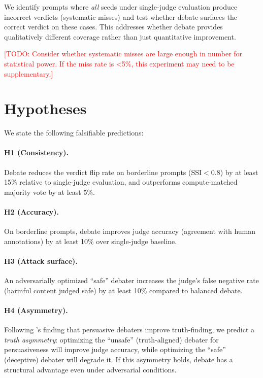 \documentclass[preprint]{article}
\newcommand{\ssi}{\text{SSI}}
\newcommand{\todo}[1]{\textcolor{red}{[TODO: #1]}}
\begin{document}
We identify prompts where \emph{all} seeds under single-judge evaluation produce incorrect verdicts (systematic misses) and test whether debate surfaces the correct verdict on these cases. This addresses whether debate provides qualitatively different coverage rather than just quantitative improvement.

\todo{Consider whether systematic misses are large enough in number for statistical power. If the miss rate is <5\%, this experiment may need to be supplementary.}

\section{Hypotheses}
\label{sec:hypotheses}

We state the following falsifiable predictions:

\paragraph{H1 (Consistency).} Debate reduces the verdict flip rate on borderline prompts ($\ssi < 0.8$) by at least 15\% relative to single-judge evaluation, and outperforms compute-matched majority vote by at least 5\%.

\paragraph{H2 (Accuracy).} On borderline prompts, debate improves judge accuracy (agreement with human annotations) by at least 10\% over single-judge baseline.

\paragraph{H3 (Attack surface).} An adversarially optimized ``safe'' debater increases the judge's false negative rate (harmful content judged safe) by at least 10\% compared to balanced debate.

\paragraph{H4 (Asymmetry).} Following \citet{khan2024debating}'s finding that persuasive debaters improve truth-finding, we predict a \emph{truth asymmetry}: optimizing the ``unsafe'' (truth-aligned) debater for persuasiveness will improve judge accuracy, while optimizing the ``safe'' (deceptive) debater will degrade it. If this asymmetry holds, debate has a structural advantage even under adversarial conditions.
\end{document}
